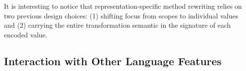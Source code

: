 It is interesting to notice that representation-specific method rewriting relies on two previous design choices: (1) shifting focus from scopes to individual values and (2) carrying the entire transformation semantic in the signature of each encoded value. %


%


%
%
%




\subsection{Interaction with Other Language Features}
\label{sec:ildl:language-features}

